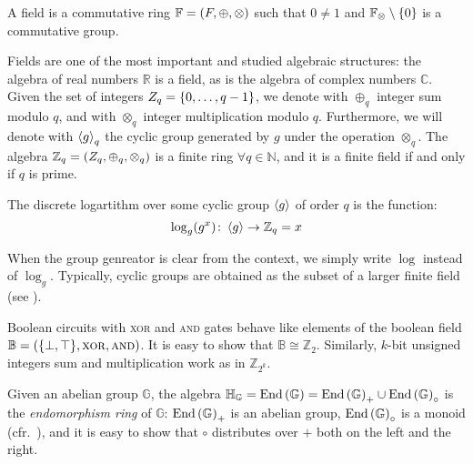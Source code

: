 \begin{definition}[Field]
  A field is a commutative ring \(\mathbb{F} = \left(F, \oplus, \otimes\right)\) such that
  \(0 \neq 1\) and \(\mathbb{F}_{\otimes} \setminus \left\{0\right\}\) is a commutative group.
\end{definition}

Fields are one of the most important and studied algebraic structures: the algebra of real numbers 
\(\mathbb{R}\) is a field, as is the algebra of complex numbers \(\mathbb{C}\).
Given the set of integers \(Z_q = \left\{0, \dots, q-1\right\}\), we denote with \(\oplus_q\) integer sum 
modulo \(q\), and with \(\otimes_q\) integer multiplication modulo \(q\).
Furthermore, we will denote with \(\left\langle g\right\rangle_q\) the cyclic group generated by \(g\) under 
the operation \(\otimes_q\).
The algebra \(\mathbb{Z}_q = \left(Z_q, \oplus_q, \otimes_q\right)\) is a finite ring 
\(\forall q \in \mathbb{N}\), and it is a finite field if and only if \(q\) is prime.
\begin{definition}
  The discrete logartithm over some cyclic group \(\left\langle g\right\rangle\) of order \(q\) is the function:
  \[\call{\log_g}{g^x}\colon \gengroup{g} \to \mathbb{Z}_q = x\]
\end{definition}

When the group genreator is clear from the context, we simply write \(\log \) instead of \(\log_g\).
Typically, cyclic groups are obtained as the subset of a larger finite field 
(see ). 
\begin{example}
  Boolean circuits with \textsc{xor} and \textsc{and} gates behave like elements of the boolean 
  field \(\mathbb{B} = \Tuple{\Set{\bot, \top}, \bitxor, \bitand} \).
  It is easy to show that \(\mathbb{B} \cong \mathbb{Z}_2\).
  Similarly, \(k\)-bit unsigned integers sum and multiplication work as in \(\mathbb{Z}_{2^k}\).
\end{example}

\begin{example}
  Given an abelian group \(\mathbb{G}\), the algebra \(\mathbb{H}_{\mathbb{G}} = 
  \mathrm{End}\left(\mathbb{G}\right) = \mathrm{End}\left(\mathbb{G}\right)_{+} \cup \mathrm{End}\left(\mathbb{G}\right)_{\circ}\) 
  is the \emph{endomorphism ring} of \(\mathbb{G}\): \(\mathrm{End}\left(\mathbb{G}\right)_{+}\) is an abelian 
  group, \(\mathrm{End}\left(\mathbb{G}\right)_{\circ}\) is a monoid 
  (cfr.\ ), and it is easy to show that \(\circ \)
  distributes over \(+\) both on the left and the right.
\end{example}

